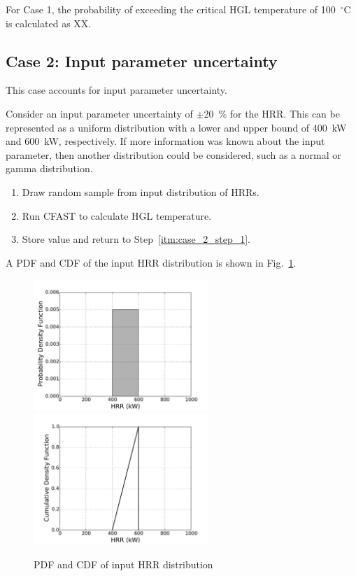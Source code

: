 \documentclass[12pt]{article}
\begin{document}
For Case 1, the probability of exceeding the critical HGL temperature of 100~$^\circ$C is calculated as XX.


\clearpage


\subsection{Case 2: Input parameter uncertainty}

This case accounts for input parameter uncertainty.

Consider an input parameter uncertainty of $\pm$20~\% for the HRR. This can be represented as a uniform distribution with a lower and upper bound of 400~kW and 600~kW, respectively. If more information was known about the input parameter, then another distribution could be considered, such as a normal or gamma distribution.

\begin{enumerate}
\item Draw random sample from input distribution of HRRs.
\label{itm:case_2_step_1}
\item Run CFAST to calculate HGL temperature.
\item Store value and return to Step~\ref{itm:case_2_step_1}.
\end{enumerate}


\clearpage


A PDF and CDF of the input HRR distribution is shown in Fig.~\ref{fig:case_2_input_distributions}.

\begin{figure}[!ht]
\includegraphics[width=2.6in]{Figures/input_PDF}
\includegraphics[width=2.6in]{Figures/input_CDF}
\caption{PDF and CDF of input HRR distribution}
\label{fig:case_2_input_distributions}
\end{figure}
\end{document}
